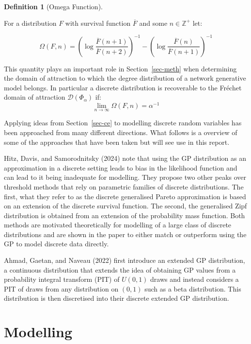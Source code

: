 \documentclass[
  10pt,
  a4paper,
]{scrreprt}
\theoremstyle{plain}
\theoremstyle{plain}
\theoremstyle{definition}
\newtheorem{definition}{Definition}[section]
\theoremstyle{plain}
\theoremstyle{remark}
\begin{document}
{\begin{definition}[Omega
Function]\protect\hypertarget{def-omega}{}\label{def-omega}

For a distribution \(F\) with survival function \(\overline F\) and some
\(n\in\mathbb Z^+\) let:

\[
\Omega(F,n) = \left(\log\displaystyle\frac{\overline F (n+1)}{\overline F (n+2)}\right)^{-1} - \left(\log\displaystyle\frac{\overline F (n)}{\overline F (n+1)}\right)^{-1}
\]

\end{definition}

This quantity plays an important role in Section~\ref{sec-meth} when
determining the domain of attraction to which the degree distribution of
a network generative model belongs. In particular a discrete
distribution is recoverable to the Fréchet domain of attraction
\(\mathcal D(\Phi_\alpha)\) if: \[
\lim_{n\rightarrow\infty}\Omega(F,n) = \alpha^{-1}
\]

Applying ideas from Section~\ref{sec-ce} to modelling discrete random
variables has been approached from many different directions. What
follows is a overview of some of the approaches that have been taken but
will see use in this report.

Hitz, Davis, and Samorodnitsky (2024) note that using the GP
distribution as an approximation in a discrete setting leads to bias in
the likelihood function and can lead to it being inadequate for
modelling. They propose two other peaks over threshold methods that rely
on parametric families of discrete distributions. The first, what they
refer to as the discrete generalised Pareto approximation is based on an
extension of the discrete survival function. The second, the generalised
Zipf distribution is obtained from an extension of the probability mass
function. Both methods are motivated theoretically for modelling of a
large class of discrete distributions and are shown in the paper to
either match or outperform using the GP to model discrete data directly.

Ahmad, Gaetan, and Naveau (2022) first introduce an extended GP
distribution, a continuous distribution that extends the idea of
obtaining GP values from a probability integral transform (PIT) of
\(U(0,1)\) draws and instead considers a PIT of draws from any
distribution on \((0,1)\) such as a beta distribution. This distribution
is then discretised into their discrete extended GP distribution.

\hypertarget{sec-mod}{%
\section{Modelling}\label{sec-mod}}

}
\end{document}
